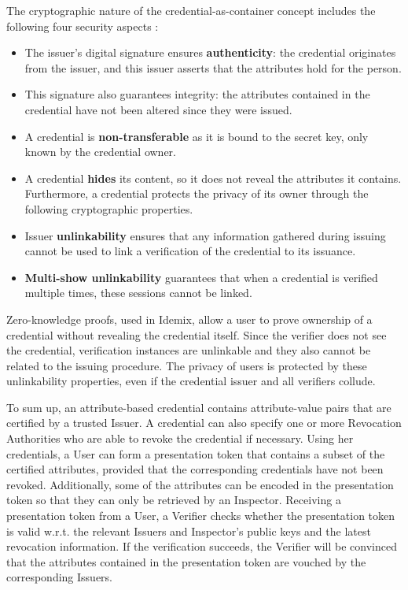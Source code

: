 The cryptographic nature of the credential-as-container concept includes the
following four security aspects \citep{vullers2013efficient}:
\begin{itemize}
	\item The issuer’s digital signature ensures \textbf{authenticity}: the credential originates
	from the issuer, and this issuer asserts that the attributes hold for the person.
	\item This signature also guarantees integrity: the attributes contained in the credential
	have not been altered since they were issued.
	\item A credential is \textbf{non-transferable} as it is bound to the secret key, only known by the credential owner.
	\item A credential \textbf{hides} its content, so it does not reveal the attributes it contains.
	Furthermore, a credential protects the privacy of its owner through the following
	cryptographic properties.
	\item Issuer \textbf{unlinkability} ensures that any information gathered during issuing
	cannot be used to link a verification of the credential to its issuance.
	\item \textbf{Multi-show unlinkability} guarantees that when a credential is verified multiple
	times, these sessions cannot be linked.
\end{itemize}

Zero-knowledge proofs, used in Idemix, allow a user to prove ownership of a credential without
revealing the credential itself. Since the verifier does not see the credential, verification
instances are unlinkable and they also cannot be related to the issuing procedure. The privacy of users is protected by these unlinkability properties, even if the credential issuer and all verifiers collude.



To sum up, an attribute-based credential contains attribute-value pairs that are certified by a trusted Issuer. A credential can also specify one or more Revocation Authorities who are able to revoke the credential if necessary. Using her credentials, a User can form a presentation token that contains a subset of the certified attributes, provided that the corresponding credentials have not been revoked. Additionally, some of the attributes can be encoded in the presentation token so that they can only be retrieved by an Inspector. Receiving a presentation token from a User, a Verifier checks whether the presentation token is valid w.r.t. the relevant Issuers and Inspector's public keys and the latest revocation information. If the verification succeeds, the Verifier will be convinced that the attributes contained in the presentation token are vouched by the corresponding Issuers.


